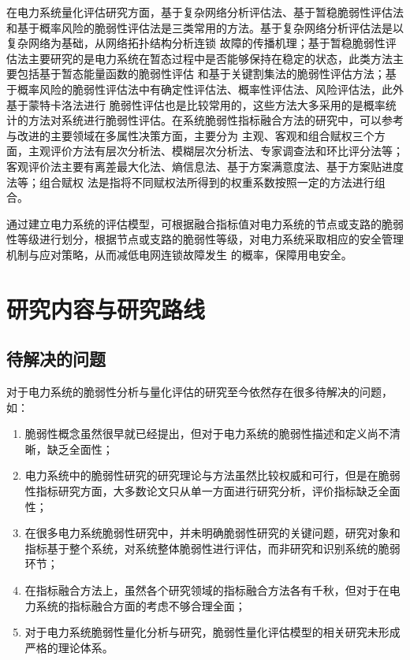 在电力系统量化评估研究方面，基于复杂网络分析评估法、基于暂稳脆弱性评估法和基于概率风险的脆弱性评估法是三类常用的方法。基于复杂网络分析评估法是以复杂网络为基础，从网络拓扑结构分析连锁
故障的传播机理\cite{refs50,refs51,refs52}；基于暂稳脆弱性评估法主要研究的是电力系统在暂态过程中是否能够保持在稳定的状态，此类方法主要包括基于暂态能量函数的脆弱性评估\cite{refs53}
和基于关键割集法的脆弱性评估方法\cite{refs54}；基于概率风险的脆弱性评估法中有确定性评估法\cite{refs55}、概率性评估法\cite{refs56}、风险评估法\cite{refs57}，此外基于蒙特卡洛法进行
脆弱性评估\cite{refs58}也是比较常用的，这些方法大多采用的是概率统计的方法对系统进行脆弱性评估。在系统脆弱性指标融合方法的研究中，可以参考与改进的主要领域在多属性决策方面，主要分为
主观、客观和组合赋权三个方面，主观评价方法有层次分析法、模糊层次分析法、专家调查法和环比评分法等；客观评价法主要有离差最大化法、熵信息法、基于方案满意度法、基于方案贴进度法等；组合赋权
法是指将不同赋权法所得到的权重系数按照一定的方法进行组合\cite{refs59}。

通过建立电力系统的评估模型，可根据融合指标值对电力系统的节点或支路的脆弱性等级进行划分，根据节点或支路的脆弱性等级，对电力系统采取相应的安全管理机制与应对策略，从而减低电网连锁故障发生
的概率，保障用电安全。



\section{研究内容与研究路线}
\label{sec:research_curise}

\subsection{待解决的问题}
\label{sec:research_problem}
对于电力系统的脆弱性分析与量化评估的研究至今依然存在很多待解决的问题，如：
\begin{enumerate}[(1)]
  \item 脆弱性概念虽然很早就已经提出，但对于电力系统的脆弱性描述和定义尚不清晰，缺乏全面性；
  \item 电力系统中的脆弱性研究的研究理论与方法虽然比较权威和可行，但是在脆弱性指标研究方面，大多数论文只从单一方面进行研究分析，评价指标缺乏全面性；
  \item 在很多电力系统脆弱性研究中，并未明确脆弱性研究的关键问题，研究对象和指标基于整个系统，对系统整体脆弱性进行评估，而非研究和识别系统的脆弱环节；
  \item 在指标融合方法上，虽然各个研究领域的指标融合方法各有千秋，但对于在电力系统的指标融合方面的考虑不够合理全面；
  \item 对于电力系统脆弱性量化分析与研究，脆弱性量化评估模型的相关研究未形成严格的理论体系。
 \end{enumerate}

